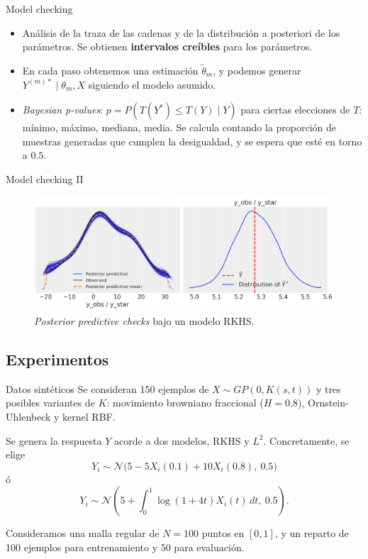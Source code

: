 \documentclass[10pt, spanish, professionalfonts]{beamer}
\begin{document}
\begin{frame}{Model checking}
  \begin{itemize}
    \item Análisis de la traza de las cadenas y de la distribución a posteriori de los parámetros. Se obtienen \textbf{intervalos creíbles} para los parámetros.
    \item En cada paso obtenemos una estimación \(\tilde \theta_m\), y podemos generar \(Y^{(m)*} \mid \theta_m, X\) siguiendo el modelo asumido.
    \item \textit{Bayesian p-values}: \(p=P(T(Y^*)\leq T(Y)\mid Y)\) para ciertas elecciones de \(T\): mínimo, máximo, mediana, media. Se calcula contando la proporción de muestras generadas que cumplen la desigualdad, y se espera que esté en torno a \(0.5\).
  \end{itemize}

\end{frame}

\begin{frame}{Model checking II}
  \begin{figure}
    \includegraphics[width=\textwidth]{img/ppc_lin}
    \caption{\textit{Posterior predictive checks} bajo un modelo RKHS.}
  \end{figure}
\end{frame}

\subsection{Experimentos}

\begin{frame}{Datos sintéticos}
  Se consideran 150 ejemplos de \(X \sim GP(0, K(s, t))\) y tres posibles variantes de \(K\): movimiento browniano fraccional (\(H=0.8\)), Ornstein-Uhlenbeck y kernel RBF.

  Se genera la respuesta \(Y\) acorde a dos modelos, RKHS y \(L^2\). Concretamente, se elige
  \[
    Y_i \sim \mathcal N\big(5 -5X_i(0.1) + 10X_i(0.8), \ 0.5\big)
  \]
  ó
  \[
    Y_i \sim \mathcal N\left(5 + \int_0^1 \log(1+4t)X_i(t)\, dt, \ 0.5\right).
  \]

Consideramos una malla regular de \(N=100\) puntos en \([0, 1]\), y un reparto de 100 ejemplos para entrenamiento y 50 para evaluación.
\end{frame}
\end{document}
